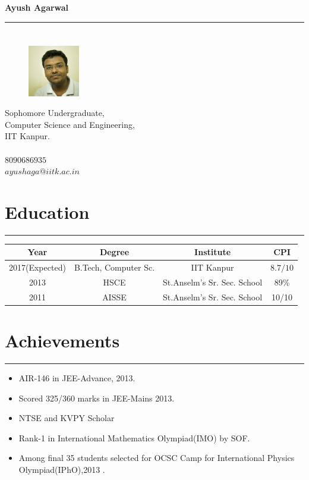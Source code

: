 \documentclass[a4paper]{article}
\author{Ayush Agarwal}
\begin{document}
\begin{center}
 \huge\textbf{Ayush Agarwal}\\
\end{center}
\hrule
\section*{}
\begin{figure} 
    \includegraphics[width=0.20\textwidth]{photo}
\end{figure}
 Sophomore Undergraduate,\\
 Computer Science and Engineering,\\
 IIT Kanpur.\\
 \\
 $8090686935$\\
 $ayushaga@iitk.ac.in$\\
 \vspace{10mm}
 \section*{Education}
 \hrule
 \begin{center}
 \vspace{3mm}
  \begin{tabular}{|c|c|c|c|}
  \hline
  Year & Degree & Institute & CPI\\
  \hline
  2017(Expected)& B.Tech, Computer Sc.&IIT Kanpur&$8.7/10$\\
  \hline
  2013& HSCE&St.Anselm's Sr. Sec. School&89\% \\
  \hline
  2011& AISSE&St.Anselm's Sr. Sec. School&10/10 \\
  \hline
  \end{tabular}
 \end{center} 
  
 \section*{Achievements}
 \hrule
 \vspace{3mm}
  \begin{itemize}
   \item AIR-146 in JEE-Advance, 2013.	
   \item Scored 325/360 marks in JEE-Mains 2013.
   \item NTSE and KVPY Scholar 
   \item Rank-1 in International Mathematics Olympiad(IMO) by SOF.
   \item Among final 35 students selected for OCSC Camp for International Physics Olympiad(IPhO),2013 .
  \end{itemize}
 
\end{document}
